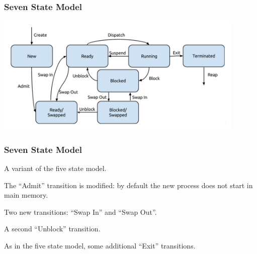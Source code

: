 \begin{frame}
	\frametitle{Seven State Model}

	\begin{center}
		\includegraphics[width=0.9\textwidth]{images/7-state-model.png}
	\end{center}

\end{frame}

\begin{frame}
	\frametitle{Seven State Model}
	A variant of the five state model.

	The ``Admit'' transition is modified: by default the new process does not start in main memory.

	Two new transitions: ``Swap In'' and ``Swap Out''.

	A second ``Unblock'' transition.

	As in the five state model, some additional ``Exit'' transitions.

\end{frame}



